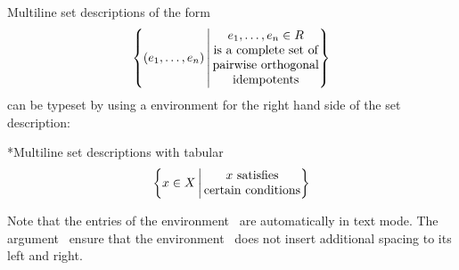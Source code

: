 Multiline set descriptions of the form
\[
  \left\{
    (e_1, \dotsc, e_n)
  \,\middle|\,
    \begin{tabular}{@{}c@{}}
      $e_1, \dotsc, e_n \in R$ \\
      is a complete set of \\
      pairwise orthogonal \\
      idempotents
    \end{tabular}
  \right\}
\]
can be typeset by using a  environment for the right hand side of the set description:
\begin{showlatex}*{Multiline set descriptions with tabular}
\[
  \left\{
    x \in X
  \,\middle|\,
    \begin{tabular}{@{}c@{}}
      $x$ satisfies \\
      certain conditions
    \end{tabular}
  \right\}
\]
\end{showlatex}
Note that the entries of the environment~ are automatically in text mode.
The argument~\inlinecode{\@\{\}} ensure that the environment~ does not insert additional spacing to its left and right.




